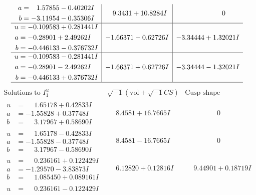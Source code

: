 \documentclass[1p]{elsarticle_modified}
\theoremstyle{definition}
\newcommand{\I}{\sqrt{-1}}
\begin{document}
$$\begin{array}{c|c|c}
\begin{aligned}
a &= \phantom{-}1.57855 - 0.40202 I \\
b &= -3.11954 - 0.35306 I\end{aligned}
 & \phantom{-}9.3431 + 10.8284 I & \phantom{-0.000000 } 0 \\ \hline\begin{aligned}
u &= -0.109583 + 0.281441 I \\
a &= -0.28901 + 2.49262 I \\
b &= -0.446133 - 0.376732 I\end{aligned}
 & -1.66371 - 0.62726 I & -3.34444 + 1.32021 I \\ \hline\begin{aligned}
u &= -0.109583 - 0.281441 I \\
a &= -0.28901 - 2.49262 I \\
b &= -0.446133 + 0.376732 I\end{aligned}
 & -1.66371 + 0.62726 I & -3.34444 - 1.32021 I\\
 \hline 
 \end{array}$$\newpage$$\begin{array}{c|c|c}  
\text{Solutions to }I^u_{1}& \I (\text{vol} + \sqrt{-1}CS) & \text{Cusp shape}\\
 \hline 
\begin{aligned}
u &= \phantom{-}1.65178 + 0.42833 I \\
a &= -1.55828 + 0.37748 I \\
b &= \phantom{-}3.17967 + 0.58690 I\end{aligned}
 & \phantom{-}8.4581 + 16.7665 I & \phantom{-0.000000 } 0 \\ \hline\begin{aligned}
u &= \phantom{-}1.65178 - 0.42833 I \\
a &= -1.55828 - 0.37748 I \\
b &= \phantom{-}3.17967 - 0.58690 I\end{aligned}
 & \phantom{-}8.4581 - 16.7665 I & \phantom{-0.000000 } 0 \\ \hline\begin{aligned}
u &= \phantom{-}0.236161 + 0.122429 I \\
a &= -1.29570 - 3.83873 I \\
b &= \phantom{-}1.085450 + 0.089161 I\end{aligned}
 & \phantom{-}6.12820 + 0.12816 I & \phantom{-}9.44901 + 0.18719 I \\ \hline\begin{aligned}
u &= \phantom{-}0.236161 - 0.122429 I \\

\end{aligned}
\end{array}$$
\end{document}
